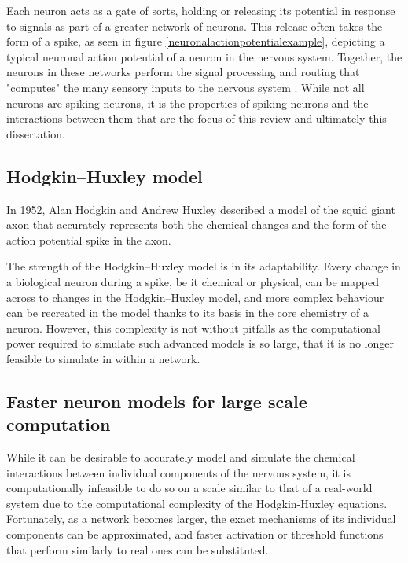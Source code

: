 Each neuron acts as a gate of sorts, holding or releasing its potential in
response to signals as part of a greater network of neurons. This release often
takes the form of a spike, as seen in figure \ref{neuronalactionpotentialexample}, depicting a typical neuronal action potential of a neuron in the nervous system.
Together, the neurons in these networks perform the signal processing and
routing that "computes" the many sensory inputs to the nervous system
\autocite{koch_biophysics_2004}. While not all neurons are spiking neurons, it %
is the properties of spiking neurons and the interactions between them that are
the focus of this review and ultimately this dissertation.

\subsection{Hodgkin–Huxley model}

In 1952, Alan Hodgkin and Andrew Huxley described a model of the squid giant
axon that accurately represents both the chemical changes and the form of the
action potential spike in the axon. \autocite{hodgkin_quantitative_1952}

The strength of the Hodgkin–Huxley model is in its adaptability. Every change in
a biological neuron during a spike, be it chemical or physical, can be mapped
across to changes in the Hodgkin–Huxley model, and more complex behaviour
can be recreated in the model thanks to its basis in the core chemistry of a
neuron. However, this complexity is not without pitfalls as the computational
power required to simulate such advanced models is so large,  that it is no
longer feasible to simulate in within a network.

\subsection{Faster neuron models for large scale computation}

While it can be desirable to accurately model and simulate the chemical
interactions between individual components of the nervous system, it is
computationally infeasible to do so on a scale similar to that of a real-world
system due to the computational complexity of the Hodgkin-Huxley equations.
Fortunately, as a network becomes larger, the exact mechanisms of its individual
components can be approximated, and faster activation or threshold functions
that perform similarly to real ones can be substituted.

